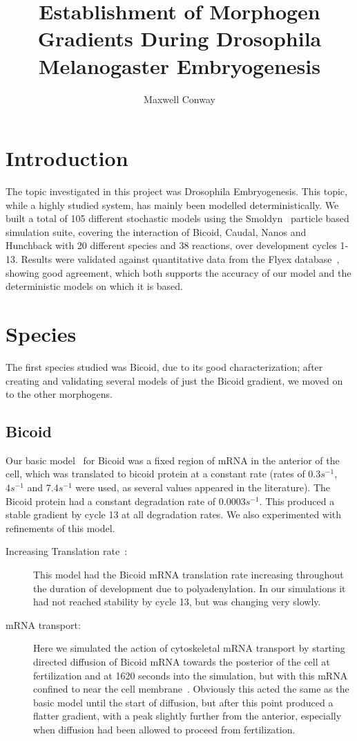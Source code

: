 \documentclass[11pt,a4paper,twocolumn]{article}
\begin{document}
\title{Establishment of Morphogen Gradients During Drosophila Melanogaster Embryogenesis}
\author{Maxwell Conway}
\date{}
\maketitle
\section{Introduction}
The topic investigated in this project was Drosophila Embryogenesis. This topic, while a highly studied system, has mainly been modelled deterministically. We built a total of 105 different stochastic models using the Smoldyn~\cite{Andrews2010} particle based simulation suite, covering the interaction of Bicoid, Caudal, Nanos and Hunchback with 20 different species and 38 reactions, over development cycles 1-13. Results were validated against quantitative data from the Flyex database~\cite{Pisarev2009}, showing good agreement, which both supports the accuracy of our model and the deterministic models on which it is based. 

\section{Species}
The first species studied was Bicoid, due to its good characterization; after creating and validating several models of just the Bicoid gradient, we moved on to the other morphogens.
\subsection{Bicoid}
Our basic model~\cite{Grimm2010} for Bicoid was a fixed region of mRNA in the anterior of the cell, which was translated to bicoid protein at a constant rate (rates of \(0.3s^{-1}\), \(4s^{-1}\) and \(7.4s^{-1}\) were used, as several values appeared in the literature). The Bicoid protein had a constant degradation rate of \(0.0003s^{-1}\). This produced a stable gradient by cycle 13 at all degradation rates. We also experimented with refinements of this model.
\begin{description}
\item[Increasing Translation rate~\cite{Holloway2011}:]
This model had the Bicoid mRNA translation rate increasing throughout the duration of development due to polyadenylation. In our simulations it had not reached stability by cycle 13, but was changing very slowly.
\item[mRNA transport:]
Here we simulated the action of cytoskeletal mRNA transport by starting directed diffusion of Bicoid mRNA towards the posterior of the cell at fertilization and at 1620 seconds into the simulation, but with this mRNA confined to near the cell membrane~\cite{Spirov2009}. Obviously this acted the same as the basic model until the start of diffusion, but after this point produced a flatter gradient, with a peak slightly further from the anterior, especially when diffusion had been allowed to proceed from fertilization.
\end{description}
\end{document}
